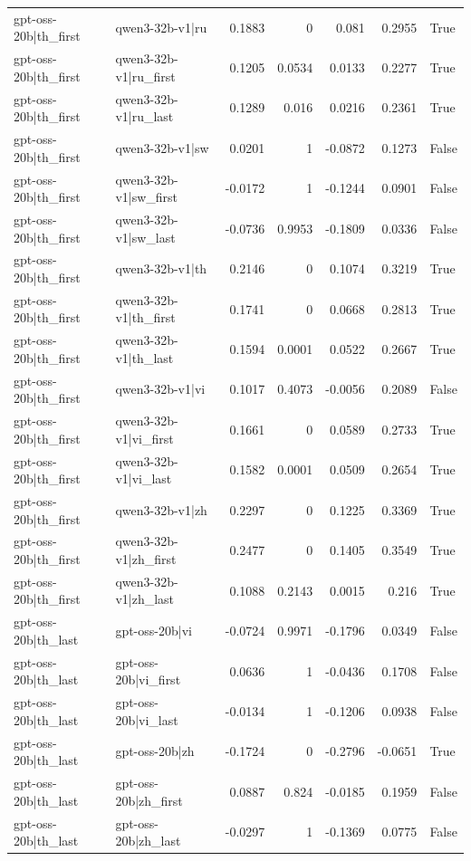 \begin{table}
\begin{tabular}{l l r r r r l}
gpt-oss-20b|th_first & qwen3-32b-v1|ru & 0.1883 & 0 & 0.081 & 0.2955 & True \\
gpt-oss-20b|th_first & qwen3-32b-v1|ru_first & 0.1205 & 0.0534 & 0.0133 & 0.2277 & True \\
gpt-oss-20b|th_first & qwen3-32b-v1|ru_last & 0.1289 & 0.016 & 0.0216 & 0.2361 & True \\
gpt-oss-20b|th_first & qwen3-32b-v1|sw & 0.0201 & 1 & -0.0872 & 0.1273 & False \\
gpt-oss-20b|th_first & qwen3-32b-v1|sw_first & -0.0172 & 1 & -0.1244 & 0.0901 & False \\
gpt-oss-20b|th_first & qwen3-32b-v1|sw_last & -0.0736 & 0.9953 & -0.1809 & 0.0336 & False \\
gpt-oss-20b|th_first & qwen3-32b-v1|th & 0.2146 & 0 & 0.1074 & 0.3219 & True \\
gpt-oss-20b|th_first & qwen3-32b-v1|th_first & 0.1741 & 0 & 0.0668 & 0.2813 & True \\
gpt-oss-20b|th_first & qwen3-32b-v1|th_last & 0.1594 & 0.0001 & 0.0522 & 0.2667 & True \\
gpt-oss-20b|th_first & qwen3-32b-v1|vi & 0.1017 & 0.4073 & -0.0056 & 0.2089 & False \\
gpt-oss-20b|th_first & qwen3-32b-v1|vi_first & 0.1661 & 0 & 0.0589 & 0.2733 & True \\
gpt-oss-20b|th_first & qwen3-32b-v1|vi_last & 0.1582 & 0.0001 & 0.0509 & 0.2654 & True \\
gpt-oss-20b|th_first & qwen3-32b-v1|zh & 0.2297 & 0 & 0.1225 & 0.3369 & True \\
gpt-oss-20b|th_first & qwen3-32b-v1|zh_first & 0.2477 & 0 & 0.1405 & 0.3549 & True \\
gpt-oss-20b|th_first & qwen3-32b-v1|zh_last & 0.1088 & 0.2143 & 0.0015 & 0.216 & True \\
gpt-oss-20b|th_last & gpt-oss-20b|vi & -0.0724 & 0.9971 & -0.1796 & 0.0349 & False \\
gpt-oss-20b|th_last & gpt-oss-20b|vi_first & 0.0636 & 1 & -0.0436 & 0.1708 & False \\
gpt-oss-20b|th_last & gpt-oss-20b|vi_last & -0.0134 & 1 & -0.1206 & 0.0938 & False \\
gpt-oss-20b|th_last & gpt-oss-20b|zh & -0.1724 & 0 & -0.2796 & -0.0651 & True \\
gpt-oss-20b|th_last & gpt-oss-20b|zh_first & 0.0887 & 0.824 & -0.0185 & 0.1959 & False \\
gpt-oss-20b|th_last & gpt-oss-20b|zh_last & -0.0297 & 1 & -0.1369 & 0.0775 & False \\

\end{tabular}
\end{table}
